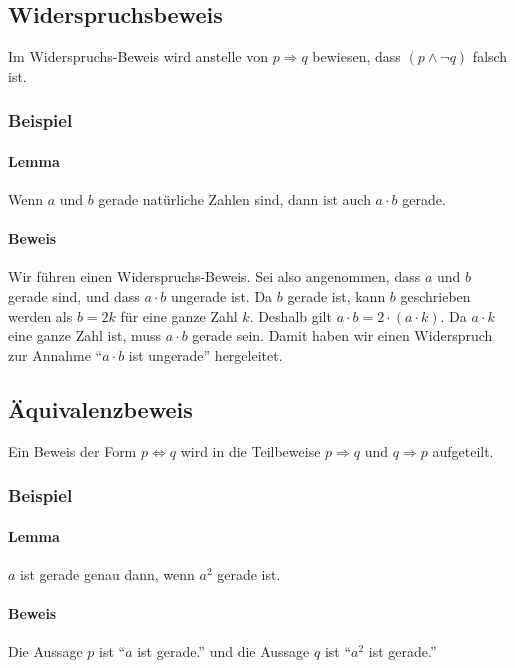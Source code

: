 \documentclass[10pt,a4paper,twoside,twocolumn]{article}
\begin{document}
	\subsection{Widerspruchsbeweis}
	Im Widerspruchs-Beweis wird anstelle von $ p \Rightarrow q $ bewiesen, dass $ (p \land \neg q) $ falsch ist.
	
	\subsubsection{Beispiel}
	
	\paragraph{Lemma} Wenn $ a $ und $ b $ gerade natürliche Zahlen sind, dann ist auch $ a \cdot b $ gerade.
	
	\paragraph{Beweis} Wir führen einen Widerspruchs-Beweis. Sei also angenommen, dass $ a $ und $ b $ gerade sind, und dass $ a \cdot b $ ungerade ist. Da $ b $ gerade ist, kann $ b $ geschrieben werden als $ b = 2k $ für eine ganze Zahl $ k $. Deshalb gilt $ a \cdot b = 2 \cdot (a \cdot k) $. Da $ a \cdot k $ eine ganze Zahl ist, muss $ a \cdot b $ gerade sein. Damit haben wir einen Widerspruch zur Annahme “$ a \cdot b $ ist ungerade” hergeleitet.
	
	\subsection{Äquivalenzbeweis}
	Ein Beweis der Form $ p \Leftrightarrow q $ wird in die Teilbeweise $ p \Rightarrow q $ und $ q \Rightarrow p $ aufgeteilt.
	
	\subsubsection{Beispiel}
	
	\paragraph{Lemma} $ a $ ist gerade genau dann, wenn $ a^2 $ gerade ist.
	
	\paragraph{Beweis} Die Aussage $ p $ ist “$ a $ ist gerade.” und die Aussage $ q $ ist “$ a^2 $ ist gerade.”
	
\end{document}
